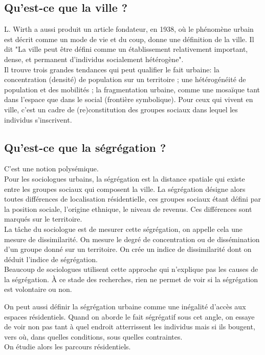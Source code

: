 \documentclass[10pt, a4paper, openany]{book}
\begin{document}
\subsection{Qu'est-ce que la ville ?}

L. Wirth a aussi produit un article fondateur, en 1938, où le phénomène urbain est décrit comme un mode de vie et du coup, donne une définition de la ville. Il dit "La ville peut être défini comme un établissement relativement important, dense, et permanent d'individus socialement hétérogène". \\
Il trouve trois grandes tendances qui peut qualifier le fait urbaine: la concentration (densité) de population sur un territoire ; une hétérogénéité de population et des mobilités ; la fragmentation urbaine, comme une mosaïque tant dans l'espace que dans le social (frontière symbolique). Pour ceux qui vivent en ville, c'est un cadre de (re)constitution des groupes sociaux dans lequel les individus s'inscrivent. 

\subsection{Qu'est-ce que la ségrégation ?}

C'est une notion polysémique. \\
Pour les sociologues urbains, la ségrégation est la distance spatiale qui existe entre les groupes sociaux qui composent la ville. La ségrégation désigne alors toutes différences de localisation résidentielle, ces groupes sociaux étant défini par la position sociale, l'origine ethnique, le niveau de revenus. Ces différences sont marqués sur le territoire. \\
La tâche du sociologue est de mesurer cette ségrégation, on appelle cela une mesure de dissimilarité. On mesure le degré de concentration ou de dissémination d'un groupe donné sur un territoire. On crée un indice de dissimilarité dont on déduit l'indice de ségrégation. \\
Beaucoup de sociologues utilisent cette approche qui n'explique pas les causes de la ségrégation. À ce stade des recherches, rien ne permet de voir si la ségrégation est volontaire ou non. 


On peut aussi définir la ségrégation urbaine comme une inégalité d'accès aux espaces résidentiels. Quand on aborde le fait ségrégatif sous cet angle, on essaye de voir non pas tant à quel endroit atterrissent les individus mais si ils bougent, vers où, dans quelles conditions, sous quelles contraintes. \\
On étudie alors les parcours résidentiels.
\end{document}
